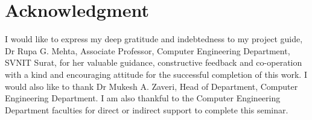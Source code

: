 \documentclass[a4paper, 12pt]{article}
\begin{document}
\newpage
{}
{}
\printbibliography[heading={References}, title=References]
\newpage
{}
\section*{\centering Acknowledgment}
\vskip 0.2in
\raggedright I would like to express my deep gratitude and indebtedness to my project guide, Dr Rupa G. Mehta, Associate Professor, Computer Engineering Department, SVNIT Surat, for her valuable guidance, constructive feedback and co-operation with a kind and encouraging attitude for the successful completion of this work. I would also like to thank Dr Mukesh A. Zaveri, Head of Department, Computer Engineering Department. I am also thankful to the Computer Engineering Department faculties for direct or indirect support to complete this seminar.
\end{document}
